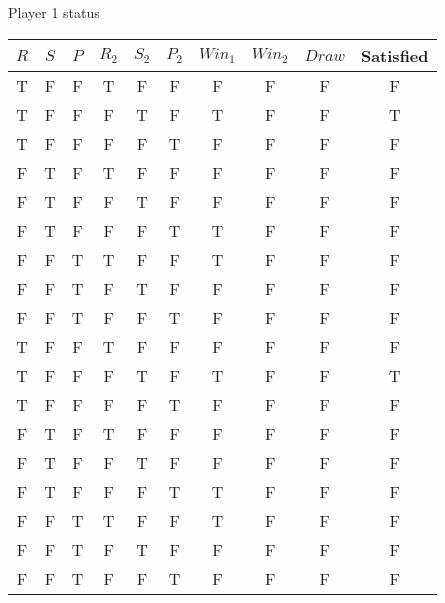 \documentclass[24pt,a4paper]{article}
\begin{document}
Player 1 status
\begin{center}
\begin{tabular}{ c c c c c c c c c | c }
	$R$ & $S$ & $P$ & 	$R_{2}$ & $S_{2}$ & $P_{2}$ & $Win_{1}$ & $Win_{2}$ & $Draw$ & Satisfied\\ \hline
	{\color{red}T} & F & F & {\color{red}T} & F & F & F & F & F & F \\ \hline
	\rowcolor{green}
	{\color{red}T} & {\color{white}F} & {\color{white}F} & {\color{white}F} & {\color{red}T} & {\color{white}F} & {\color{red}T} & {\color{white}F} & {\color{white}F} & {\color{red}T}\\ \hline
	{\color{red}T} & F & F & F & F & {\color{red}T} & F & F & F & F \\ \hline
	F & {\color{red}T} & F & {\color{red}T} & F & F & F & F & F & F \\ \hline
	F & {\color{red}T} & F & F & {\color{red}T} & F & F & F & F & F \\ \hline
	F & {\color{red}T} & F & F & F & {\color{red}T} & {\color{red}T} & F & F & F \\ \hline
	F & F & {\color{red}T} & {\color{red}T} & F & F & {\color{red}T} & F & F & F \\ \hline
	F & F & {\color{red}T} & F & {\color{red}T} & F & F & F & F & F \\ \hline
	F & F & {\color{red}T} & F & F & {\color{red}T} & F & F & F & F \\ \hline
	
	{\color{red}T} & F & F & {\color{red}T} & F & F & F & F & F & F \\ \hline
	{\color{red}T} & F & F & F & T & F & T & F & F & T \\ \hline
	{\color{red}T} & F & F & F & F & {\color{red}T} & F & F & F & F \\ \hline
	F & {\color{red}T} & F & {\color{red}T} & F & F & F & F & F & F \\ \hline
	F & {\color{red}T} & F & F & {\color{red}T} & F & F & F & F & F \\ \hline
	F & {\color{red}T} & F & F & F & {\color{red}T} & {\color{red}T} & F & F & F \\ \hline
	F & F & {\color{red}T} & {\color{red}T} & F & F & {\color{red}T} & F & F & F \\ \hline
	F & F & {\color{red}T} & F & {\color{red}T} & F & F & F & F & F \\ \hline
	F & F & {\color{red}T} & F & F & {\color{red}T} & F & F & F & F
	

\end{tabular}
\end{center}
\end{document}
